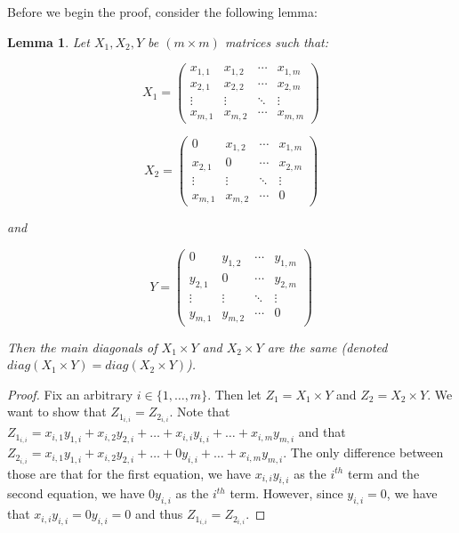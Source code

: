 \documentclass{article} %
\theoremstyle{style1}
\newtheorem{lemma}[theorem]{Lemma}
\theoremstyle{style1}
\theoremstyle{example}
\begin{document}
\GARP*

Before we begin the proof, consider the following lemma:

\begin{lemma}
\label{lma:LemmaA}
Let $X_1, X_2, Y$ be $(m\times m)$ matrices such that:

\begin{minipage}{.5\linewidth}
\[
X_1 =
 \begin{pmatrix}
  x_{1,1} & x_{1,2} & \cdots & x_{1,m} \\
  x_{2,1} & x_{2,2} & \cdots & x_{2,m} \\
  \vdots  & \vdots  & \ddots & \vdots  \\
  x_{m,1} & x_{m,2} & \cdots & x_{m,m}
 \end{pmatrix}
\]
\end{minipage}
\begin{minipage}{.5\linewidth}
\[
X_2 =
 \begin{pmatrix}
  0 & x_{1,2} & \cdots & x_{1,m} \\
  x_{2,1} & 0 & \cdots & x_{2,m} \\
  \vdots  & \vdots  & \ddots & \vdots  \\
  x_{m,1} & x_{m,2} & \cdots & 0
 \end{pmatrix}
\]
\end{minipage}
and 

\[
Y =
 \begin{pmatrix}
  0 & y_{1,2} & \cdots & y_{1,m} \\
  y_{2,1} & 0 & \cdots & y_{2,m} \\
  \vdots  & \vdots  & \ddots & \vdots  \\
  y_{m,1} & y_{m,2} & \cdots & 0
 \end{pmatrix}
\]

Then the main diagonals of $X_1\times Y$ and $X_2\times Y$ are the same (denoted $diag(X_1\times Y)=diag(X_2\times Y)$).
\end{lemma}

\begin{proof}
Fix an arbitrary $i\in\{1,\ldots,m\}$. Then let $Z_1=X_1\times Y$ and $Z_2=X_2\times Y$. We want to show that $Z_{1_{i,i}}=Z_{2_{i,i}}$. Note that $Z_{1_{i,i}}=x_{i,1}y_{1,i}+x_{i,2}y_{2,i}+\ldots+x_{i,i}y_{i,i}+\ldots+x_{i,m}y_{m,i}$ and that $Z_{2_{i,i}}=x_{i,1}y_{1,i}+x_{i,2}y_{2,i}+\ldots+0y_{i,i}+\ldots+x_{i,m}y_{m,i}$. The only difference between those are that for the first equation, we have $x_{i,i}y_{i,i}$ as the $i^{th}$ term and the second equation, we have $0y_{i,i}$ as the $i^{th}$ term. However, since $y_{i,i}=0$, we have that $x_{i,i}y_{i,i}=0y_{i,i}=0$ and thus $Z_{1_{i,i}}=Z_{2_{i,i}}$.
\end{proof}
\end{document}
